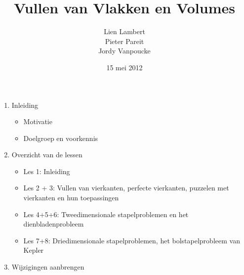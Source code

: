 \documentclass[dutch]{beamer}
\title[Vullen van Vlakken en Volumes]{Vullen van Vlakken en Volumes}
\author[Lien Lambert \& Pieter Pareit \& Jordy Vanpoucke ]{Lien Lambert \\Pieter Pareit \\Jordy Vanpoucke}
\date{\tiny 15 mei 2012}
\begin{document}
\frame{
\titlepage}

\begin{frame}

\begin{enumerate}
	\item Inleiding
	  \begin{itemize}
	    \item Motivatie
	    \item Doelgroep en voorkennis
    \end{itemize}
  \item Overzicht van de lessen
    \begin{itemize}
	    \item Les 1: Inleiding
	    \item Les 2 + 3: Vullen van vierkanten, perfecte vierkanten, puzzelen met vierkanten en hun toepassingen
	    \item Les 4+5+6: Tweedimensionale stapelproblemen en het dienbladenprobleem
	    \item Les 7+8: Driedimensionale stapelproblemen, het bolstapelprobleem van Kepler
    \end{itemize}
  \item Wijzigingen aanbrengen
\end{enumerate}
\end{frame}
\end{document}
